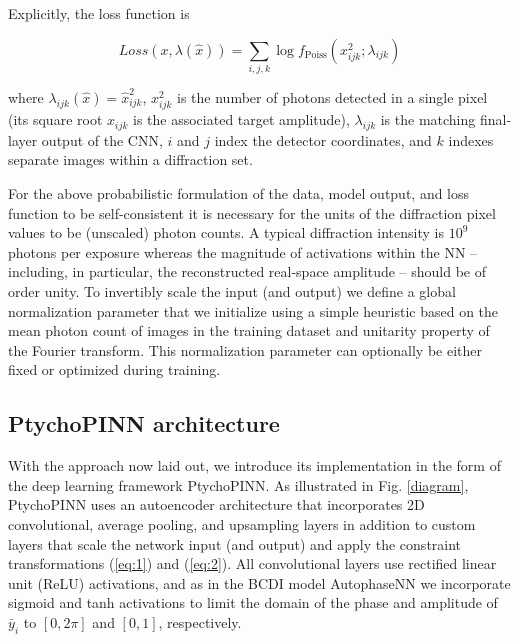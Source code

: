 \documentclass[sn-mathphys]{sn-jnl}%
\theoremstyle{thmstyleone}%
\theoremstyle{thmstyletwo}%
\theoremstyle{thmstylethree}%
\begin{document}
Explicitly, the loss function is

$$
Loss(x, \lambda(\hat{x})) = \sum_{i,j,k}\log f_{\text{Poiss}}(x_{ijk}^2;\lambda_{ijk})
$$


where $\lambda_{ijk}(\hat{x}) = \hat{x}_{ijk}^2$, $x_{ijk}^2$ is the number of photons detected in a single pixel (its square root $x_{ijk}$ is the associated target amplitude), $\lambda_{ijk}$ is the matching final-layer output of the CNN, $i$ and $j$ index the detector coordinates, and $k$ indexes separate images within a diffraction set. 

For the above probabilistic formulation of the data, model output, and loss function to be self-consistent it is necessary for the units of the diffraction pixel values to be (unscaled) photon counts. A typical diffraction intensity is $10^9$ photons per exposure whereas the magnitude of activations within the NN -- including, in particular, the reconstructed real-space amplitude -- should be of order unity. To invertibly scale the input (and output) we define a global normalization parameter that we initialize using a simple heuristic based on the mean photon count of images in the training dataset and unitarity property of the Fourier transform.   This normalization parameter can optionally be either fixed or optimized during training. 

\subsection{PtychoPINN architecture}
With the approach now laid out, we introduce its implementation in the form of the deep learning framework PtychoPINN. As illustrated in Fig. \ref{diagram}, PtychoPINN uses an autoencoder architecture that incorporates 2D convolutional, average pooling, and upsampling layers in addition to custom layers that scale the network input (and output) and apply the constraint transformations (\ref{eq:1}) and (\ref{eq:2}). All convolutional layers use rectified linear unit (ReLU) activations, and as in the BCDI model AutophaseNN we incorporate sigmoid and tanh activations to limit the domain of the phase and amplitude of $\bar{y}_i$ to $[0, 2 \pi]$ and $[0, 1]$, respectively. \cite{yao2022autophasenn}
\end{document}
